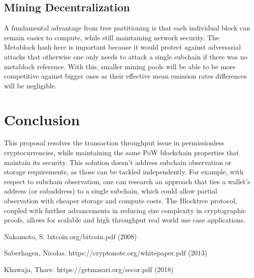 \documentclass{article}
\begin{document}
\subsection{Mining Decentralization}
A fundamental advantage from tree partitioning is that each individual block can remain easier to compute, while still maintaining network security. The Metablock hash here is important because it would protect against adversarial attacks that otherwise one only needs to attack a single subchain if there was no metablock reference. With this, smaller mining pools will be able to be more competitive against bigger ones as their effective mean emission rates differences will be negligible.
\section{Conclusion}
This proposal resolves the transaction throughput issue in permissionless cryptocurrencies, while maintaining the same PoW blockchain properties that maintain its security. This solution doesn't address subchain observation or storage requirements, as those can be tackled independently. For example, with respect to subchain observation, one can research an approach that ties a wallet's address (or subaddress) to a single subchain, which could allow partial observation with cheaper storage and compute costs. The Blocktree protocol, coupled with further advancements in reducing size complexity in cryptographic proofs, allows for scalable and high throughput real world use case applications.

\begin{thebibliography}{999}
  Nakamoto, S.
  \newblock bitcoin.org/bitcoin.pdf (2008)

  Saberhagen, Nicolas.
  \newblock https://cryptonote.org/whitepaper.pdf (2013)

  Khawaja, Thaer.
  \newblock https://getmasari.org/secor.pdf (2018)
\end{thebibliography}
\end{document}
